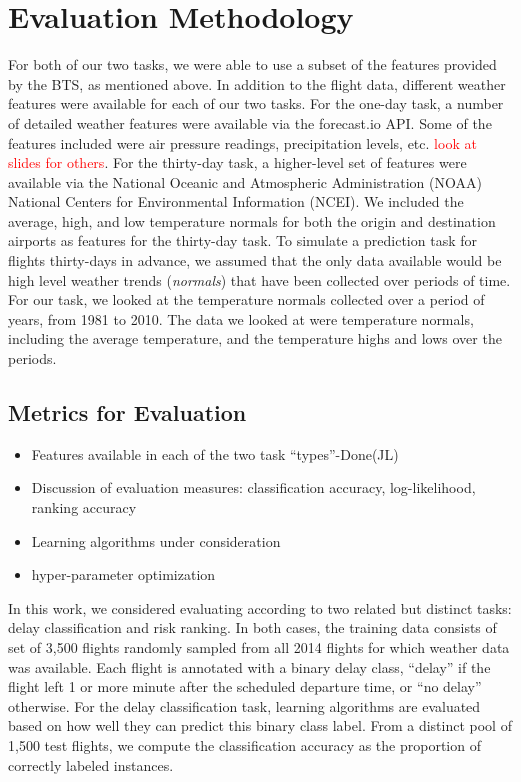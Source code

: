 \documentclass{article}
\begin{document}
\section{Evaluation Methodology}
\label{sec:evaluation-methodology}


For both of our two tasks, we were able to use a subset of the features provided by the BTS, as mentioned above.
In addition to the flight data, different weather features were available for each of our two tasks. 
For the one-day task, a number of detailed weather features were available via the forecast.io API.
Some of the features included were air pressure readings, precipitation levels, etc. \textcolor{red}{look at slides for others}. 
For the thirty-day task, a higher-level set of features were available via the National Oceanic and Atmospheric Administration (NOAA) National Centers for Environmental Information (NCEI)\cite{noaaclimatedata}.
We included the average, high, and low temperature normals for both the origin and destination airports as features for the thirty-day task.
To simulate a prediction task for flights thirty-days in advance, we assumed that the only data available would be high level weather trends (\emph{normals}) that have been collected over periods of time. 
For our task, we looked at the temperature normals collected over a period of years, from 1981 to 2010. 
The data we looked at were temperature normals, including the average temperature, and the temperature highs and lows over the periods. 

\subsection{Metrics for Evaluation}



    \begin{itemize}
        \item Features available in each of the two task ``types''-Done(JL)
        \item Discussion of evaluation measures: classification accuracy, log-likelihood, ranking accuracy
        \item Learning algorithms under consideration
        \item hyper-parameter optimization
\end{itemize}


In this work, we considered evaluating according to two related but distinct tasks: delay classification and risk ranking. In both cases, the training data consists of set of 3,500 flights randomly sampled from all 2014 flights for which weather data was available. Each flight is annotated with a binary delay class, ``delay'' if the flight left 1 or more minute after the scheduled departure time, or ``no delay'' otherwise. For the delay classification task, learning algorithms are evaluated based on how well they can predict this binary class label. From a distinct pool of 1,500 test flights, we compute the classification accuracy as the proportion of correctly labeled instances.
\end{document}
